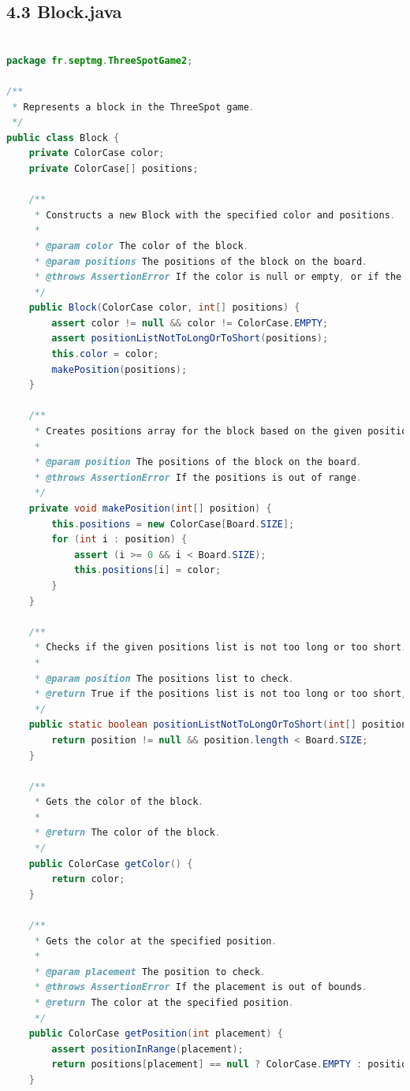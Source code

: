 \documentclass[a4paper,11pt]{article}
\begin{document}
\subsection{4.3 Block.java}

\begin{lstlisting}[language=Java, breaklines=true]

package fr.septmg.ThreeSpotGame2;

/**
 * Represents a block in the ThreeSpot game.
 */
public class Block {
    private ColorCase color;
    private ColorCase[] positions;

    /**
     * Constructs a new Block with the specified color and positions.
     *
     * @param color The color of the block.
     * @param positions The positions of the block on the board.
     * @throws AssertionError If the color is null or empty, or if the positions list is too long or too short.
     */
    public Block(ColorCase color, int[] positions) {
        assert color != null && color != ColorCase.EMPTY;
        assert positionListNotToLongOrToShort(positions);
        this.color = color;
        makePosition(positions);
    }

    /**
     * Creates positions array for the block based on the given positions.
     *
     * @param position The positions of the block on the board.
     * @throws AssertionError If the positions is out of range.
     */
    private void makePosition(int[] position) {
        this.positions = new ColorCase[Board.SIZE];
        for (int i : position) {
            assert (i >= 0 && i < Board.SIZE);
            this.positions[i] = color;
        }
    }

    /**
     * Checks if the given positions list is not too long or too short.
     *
     * @param position The positions list to check.
     * @return True if the positions list is not too long or too short, false otherwise.
     */
    public static boolean positionListNotToLongOrToShort(int[] position) {
        return position != null && position.length < Board.SIZE;
    }

    /**
     * Gets the color of the block.
     *
     * @return The color of the block.
     */
    public ColorCase getColor() {
        return color;
    }

    /**
     * Gets the color at the specified position.
     *
     * @param placement The position to check.
     * @throws AssertionError If the placement is out of bounds.
     * @return The color at the specified position.
     */
    public ColorCase getPosition(int placement) {
        assert positionInRange(placement);
        return positions[placement] == null ? ColorCase.EMPTY : positions[placement];
    }


\end{lstlisting}
\end{document}
